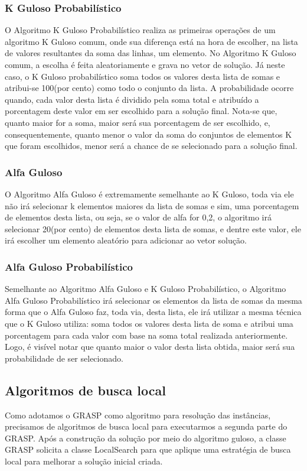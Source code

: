 \documentclass[12pt]{article}
\begin{document}
\subsubsection{K Guloso Probabilístico}

O Algoritmo K Guloso Probabilístico realiza as primeiras operações de um algoritmo K Guloso comum, onde sua diferença está na hora de escolher, na lista de valores resultantes da soma das linhas, um elemento. No Algoritmo K Guloso comum, a escolha é feita aleatoriamente e grava no vetor de solução. Já neste caso, o K Guloso probabilístico soma todos os valores desta lista de somas e atribui-se 100(por cento) como todo o conjunto da lista. A probabilidade ocorre quando, cada valor desta lista é dividido pela soma total e atribuído a porcentagem deste valor em ser escolhido para a solução final. Nota-se que, quanto maior for a soma, maior será sua porcentagem de ser escolhido, e, consequentemente, quanto menor o valor da soma do conjuntos de elementos K que foram escolhidos, menor será a chance de se selecionado para a solução final.

\subsubsection{Alfa Guloso}

O Algoritmo Alfa Guloso é extremamente semelhante ao K Guloso, toda via ele não irá selecionar k elementos maiores da lista de somas e sim, uma porcentagem de elementos desta lista, ou seja, se o valor de alfa for 0,2, o algoritmo irá selecionar 20(por cento) de elementos desta lista de somas, e dentre este valor, ele irá escolher um elemento aleatório para adicionar ao vetor solução.

\subsubsection{Alfa Guloso Probabilístico}

Semelhante ao Algoritmo Alfa Guloso e K Guloso Probabilístico, o Algoritmo Alfa Guloso Probabilístico irá selecionar os elementos da lista de somas da mesma forma que o Alfa Guloso faz, toda via, desta lista, ele irá utilizar a mesma técnica que o K Guloso utiliza: soma todos os valores desta lista de soma e atribui uma porcentagem para cada valor com base na soma total realizada anteriormente. Logo, é visível notar que quanto maior o valor desta lista obtida, maior será sua probabilidade de ser selecionado.

\subsection{Algoritmos de busca local}
Como adotamos o GRASP como algoritmo para resolução das instâncias, precisamos de algoritmos de busca local para executarmos a segunda parte do GRASP. Após a construção da solução por meio do algoritmo guloso, a classe GRASP solicita a classe LocalSearch para que aplique uma estratégia de busca local para melhorar a solução inicial criada.
\end{document}

